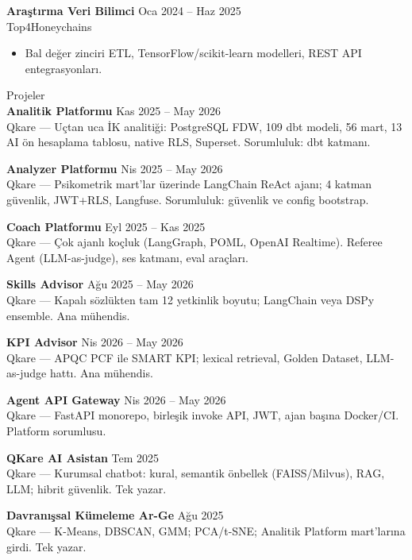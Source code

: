 \documentclass[11pt,a4paper]{article}
\newcommand{\cvsection}[1]{%
  \vspace{0.7em}%
  {\normalsize\fontseries{m}\selectfont #1}\\[0.25em]
}
\newcommand{\jobentry}[4]{%
  \textbf{#1} \hfill {\small #2}\\
  {\small #3} \hfill {\small #4}\\[0.2em]
}
\begin{document}
\jobentry{Araştırma Veri Bilimci}{Oca 2024 -- Haz 2025}{Top4Honeychains}{}
\begin{itemize}[leftmargin=1.2em, nosep, topsep=2pt]
  \item Bal değer zinciri ETL, TensorFlow/scikit-learn modelleri, REST API entegrasyonları.
\end{itemize}

\cvsection{Projeler}

\textbf{Analitik Platformu} \hfill Kas 2025 -- May 2026\\
Qkare --- Uçtan uca İK analitiği: PostgreSQL FDW, 109 dbt modeli, 56 mart, 13 AI ön hesaplama tablosu, native RLS, Superset. Sorumluluk: dbt katmanı.

\vspace{0.25em}
\textbf{Analyzer Platformu} \hfill Nis 2025 -- May 2026\\
Qkare --- Psikometrik mart'lar üzerinde LangChain ReAct ajanı; 4 katman güvenlik, JWT+RLS, Langfuse. Sorumluluk: güvenlik ve config bootstrap.

\vspace{0.25em}
\textbf{Coach Platformu} \hfill Eyl 2025 -- Kas 2025\\
Qkare --- Çok ajanlı koçluk (LangGraph, POML, OpenAI Realtime). Referee Agent (LLM-as-judge), ses katmanı, eval araçları.

\vspace{0.25em}
\textbf{Skills Advisor} \hfill Ağu 2025 -- May 2026\\
Qkare --- Kapalı sözlükten tam 12 yetkinlik boyutu; LangChain veya DSPy ensemble. Ana mühendis.

\vspace{0.25em}
\textbf{KPI Advisor} \hfill Nis 2026 -- May 2026\\
Qkare --- APQC PCF ile SMART KPI; lexical retrieval, Golden Dataset, LLM-as-judge hattı. Ana mühendis.

\vspace{0.25em}
\textbf{Agent API Gateway} \hfill Nis 2026 -- May 2026\\
Qkare --- FastAPI monorepo, birleşik invoke API, JWT, ajan başına Docker/CI. Platform sorumlusu.

\vspace{0.25em}
\textbf{QKare AI Asistan} \hfill Tem 2025\\
Qkare --- Kurumsal chatbot: kural, semantik önbellek (FAISS/Milvus), RAG, LLM; hibrit güvenlik. Tek yazar.

\vspace{0.25em}
\textbf{Davranışsal Kümeleme Ar-Ge} \hfill Ağu 2025\\
Qkare --- K-Means, DBSCAN, GMM; PCA/t-SNE; Analitik Platform mart'larına girdi. Tek yazar.
\end{document}
